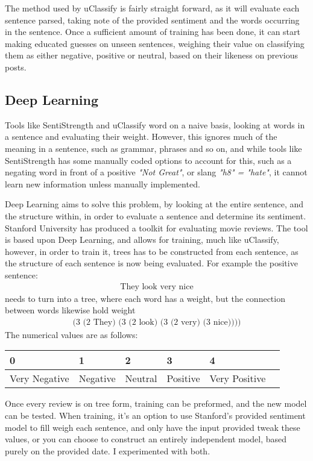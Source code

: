 \documentclass{sig-alternate}
\begin{document}
The method used by uClassify is fairly straight forward, as it will evaluate each sentence parsed, taking note of the provided sentiment and the words occurring in the sentence. Once a sufficient amount of training has been done, it can start making educated guesses on unseen sentences, weighing their value on classifying them as either negative, positive or neutral, based on their likeness on previous posts.

\subsection{Deep Learning}
Tools like SentiStrength and uClassify word on a naive basis, looking at words in a sentence and evaluating their weight. However, this ignores much of the meaning in a sentence, such as grammar, phrases and so on, and while tools like SentiStrength has some manually coded options to account for this, such as a negating word in front of a positive \textit{"Not Great"}, or slang \textit{"h8" = "hate"}, it cannot learn new information unless manually implemented.

Deep Learning aims to solve this problem, by looking at the entire sentence, and the structure within, in order to evaluate a sentence and determine its sentiment. Stanford University has produced a toolkit\cite{STANFORD} for evaluating movie reviews. The tool is based upon Deep Learning, and allows for training, much like uClassify, however, in order to train it, trees has to be constructed from each sentence, as the structure of each sentence is now being evaluated.
For example the positive sentence:
\begin{gather*}
\mbox{They look very nice}
\end{gather*}
needs to turn into a tree, where each word has a weight, but the connection between words likewise hold weight
\begin{gather*}
\mbox{(3 (2 They) (3 (2 look) (3 (2 very) (3 nice))))}
\end{gather*}
The numerical values are as follows:
\begin{table}[h!]
\begin{tabular}{l l l l ll}
0 & 1 & 2 & 3 & 4\\
\hline
Very Negative & Negative & Neutral & Positive & Very Positive
\end{tabular}
\end{table}

Once every review is on tree form, training can be preformed, and the new model can be tested. When training, it's an option to use Stanford's provided sentiment model to fill weigh each sentence, and only have the input provided tweak these values, or you can choose to construct an entirely independent model, based purely on the provided date. I experimented with both.
\end{document}
